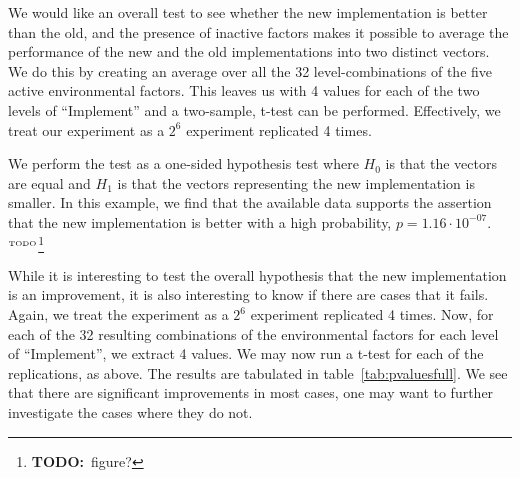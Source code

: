 \documentclass{llncs}
\newcommand{\todo}[1]{\ensuremath{^{\textrm{\tiny{TODO}\normalsize}}}\footnote{\textbf{TODO:}~#1}}
\begin{document}
We would like an overall test to see whether the new implementation is
better than the old, and the presence of inactive factors makes it
possible to average the performance of the new and the old
implementations into two distinct vectors. We do this by creating an
average over all the 32 level-combinations of the five active
environmental factors. This leaves us with 4 values for each of the
two levels of ``Implement'' and a two-sample, t-test can be
performed. Effectively, we treat our experiment as a $2^6$ experiment
replicated 4 times.

We perform the test as a one-sided hypothesis test where $H_0$ is that
the vectors are equal and $H_1$ is that the vectors representing the
new implementation is smaller. In this example, we find that the
available data supports the assertion that the new implementation is
better with a high probability, $p=1.16 \cdot 10^{-07}$.\todo{figure?}

While it is interesting to test the overall hypothesis that the new
implementation is an improvement, it is also interesting to know if
there are cases that it fails. Again, we treat the experiment as a
$2^6$ experiment replicated 4 times. Now, for each of the 32 resulting
combinations of the environmental factors for each level of
``Implement'', we extract 4 values. We may now run a t-test for each
of the replications, as above. The results are tabulated in
table~\ref{tab:pvaluesfull}. We see that there are significant
improvements in most cases, one may want to further investigate the
cases where they do not.
\end{document}
